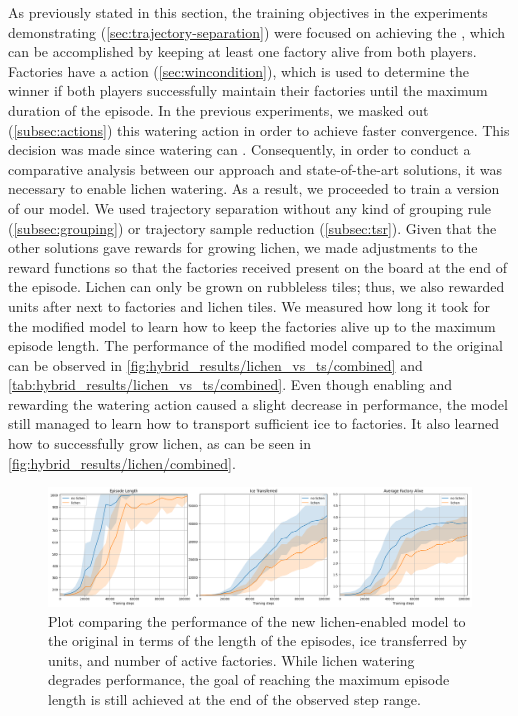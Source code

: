 \noindent As previously stated in this section, the training objectives in the experiments demonstrating  (\autoref{sec:trajectory-separation}) were focused on achieving the , which can be accomplished by keeping at least one factory alive from both players. Factories have a  action (\autoref{sec:wincondition}), which is used to determine the winner if both players successfully maintain their factories until the maximum duration of the episode. In the previous experiments, we masked out (\autoref{subsec:actions}) this watering action in order to achieve faster convergence. This decision was made since watering can . Consequently, in order to conduct a comparative analysis between our approach and state-of-the-art solutions, it was necessary to enable lichen watering. As a result, we proceeded to train a  version of our model. We used trajectory separation without any kind of grouping rule (\autoref{subsec:grouping}) or trajectory sample reduction (\autoref{subsec:tsr}). Given that the other solutions gave rewards for growing lichen, we made adjustments to the reward functions so that the factories received  present on the board at the end of the episode. Lichen can only be grown on rubbleless tiles; thus, we also rewarded units after  next to factories and lichen tiles. We measured how long it took for the modified model to learn how to keep the factories alive up to the maximum episode length. The performance of the modified model compared to the original can be observed in \autoref{fig:hybrid_results/lichen_vs_ts/combined} and \autoref{tab:hybrid_results/lichen_vs_ts/combined}. Even though enabling and rewarding the watering action caused a slight decrease in performance, the model still managed to learn how to transport sufficient ice to factories. It also learned how to successfully grow lichen, as can be seen in \autoref{fig:hybrid_results/lichen/combined}.

\begin{figure}[htbp]
    \centering
    \includegraphics[width=0.95\linewidth]{images/results_hybrid/lichen_vs_ts/combined.png}
    \captionsetup{justification=justified, singlelinecheck=false, width=1\linewidth, labelfont=bf} 
    \caption[]{Plot comparing the performance of the new lichen-enabled model to the original in terms of the length of the episodes, ice transferred by units, and number of active factories. While lichen watering degrades performance, the goal of reaching the maximum episode length is still achieved at the end of the observed step range.}
    \label{fig:hybrid_results/lichen_vs_ts/combined}
\end{figure}

